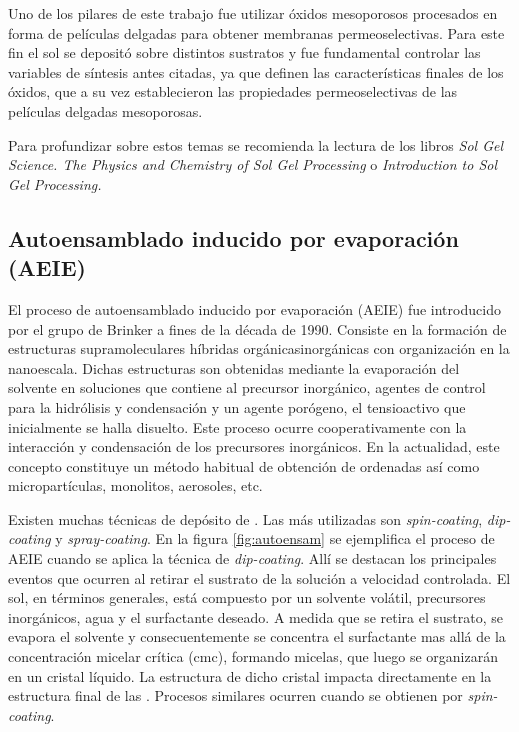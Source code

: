	 Uno de los pilares de este trabajo fue utilizar óxidos mesoporosos procesados en forma de películas delgadas para obtener membranas permeoselectivas. Para este fin el sol se depositó sobre distintos sustratos y fue fundamental controlar las variables de síntesis antes citadas, ya que definen las características finales de los óxidos, que a su vez establecieron las propiedades permeoselectivas de las películas delgadas mesoporosas.

	 Para profundizar sobre estos temas se recomienda la lectura de los libros \textit{Sol Gel Science. The Physics and Chemistry of Sol Gel Processing}\cite{Wright2001} o \textit{Introduction to Sol Gel Processing.} \cite{Pierre1998} 
	
	\subsection{Autoensamblado inducido por evaporación (AEIE)}

	 El proceso de autoensamblado inducido por evaporación (AEIE) fue introducido por el grupo de Brinker a fines de la década de 1990.\cite{Lu1997,Brinker1999} Consiste en la formación de estructuras supramoleculares híbridas orgánicas\textbar inorgánicas con organización en la nanoescala. Dichas estructuras son obtenidas mediante la evaporación del solvente en soluciones que contiene al precursor inorgánico, agentes de control para la hidrólisis y condensación y un agente porógeno, el tensioactivo que inicialmente se halla disuelto. Este proceso ocurre cooperativamente con la interacción y condensación de los precursores inorgánicos. En la actualidad, este concepto constituye un método habitual de obtención de \pdm\space ordenadas\cite{Grosso2004} así como micropartículas, monolitos, aerosoles, etc.\cite{Yang1998a}


	 Existen muchas técnicas de depósito de \pdm. Las más utilizadas son \textit{spin-coating}, \textit{dip-coating} y \textit{spray-coating}. En la figura \ref{fig:autoensam} se ejemplifica el proceso de AEIE cuando se aplica la técnica de \textit{dip-coating}. Allí se destacan los principales eventos que ocurren al retirar el sustrato de la solución a velocidad controlada. El sol, en términos generales, está compuesto por un solvente volátil, precursores inorgánicos, agua y el surfactante deseado. A medida que se retira el sustrato, se evapora el solvente y consecuentemente se concentra el surfactante mas allá de la concentración micelar crítica (cmc), formando micelas, que luego se organizarán en un cristal líquido. La estructura de dicho cristal impacta directamente en la estructura final de las \pdm. Procesos similares ocurren cuando se obtienen \pdm\space por \textit{spin-coating}. 
 				
